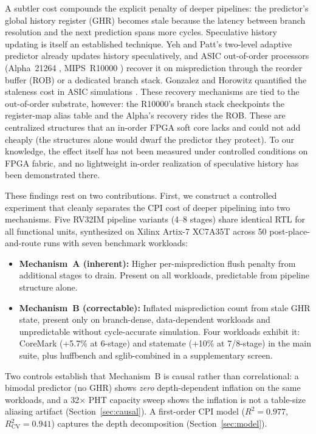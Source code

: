 \documentclass[acmsmall,nonacm,screen]{acmart}
\begin{document}
A subtler cost compounds the explicit penalty of deeper pipelines: the predictor's global history register (GHR) becomes stale because the latency between branch resolution and the next prediction spans more cycles.
Speculative history updating is itself an established technique. Yeh and Patt's two-level adaptive predictor \cite{yeh1991two} already updates history speculatively, and ASIC out-of-order processors (Alpha~21264 \cite{kessler1999alpha}, MIPS~R10000 \cite{yeager1996mips}) recover it on misprediction through the reorder buffer (ROB) or a dedicated branch stack. Gonzalez and Horowitz quantified the staleness cost in ASIC simulations \cite{gonzalez1999power}.
These recovery mechanisms are tied to the out-of-order substrate, however: the R10000's branch stack checkpoints the register-map alias table and the Alpha's recovery rides the ROB. These are centralized structures that an in-order FPGA soft core lacks and could not add cheaply (the structures alone would dwarf the predictor they protect).
To our knowledge, the effect itself has not been measured under controlled conditions on FPGA fabric, and no lightweight in-order realization of speculative history has been demonstrated there.

These findings rest on two contributions.
First, we construct a controlled experiment that cleanly separates the CPI cost of deeper pipelining into two mechanisms. Five RV32IM pipeline variants (4--8 stages) share identical RTL for all functional units, synthesized on Xilinx Artix-7 XC7A35T across 50 post-place-and-route runs with seven benchmark workloads:

\begin{itemize}
\item \textbf{Mechanism~A (inherent):} Higher per-misprediction flush penalty from additional stages to drain. Present on all workloads, predictable from pipeline structure alone.
\item \textbf{Mechanism~B (correctable):} Inflated misprediction count from stale GHR state, present only on branch-dense, data-dependent workloads and unpredictable without cycle-accurate simulation. Four workloads exhibit it: CoreMark (+5.7\% at 6-stage) and statemate (+10\% at 7/8-stage) in the main suite, plus huffbench and sglib-combined in a supplementary screen.
\end{itemize}

Two controls establish that Mechanism~B is causal rather than correlational: a bimodal predictor (no GHR) shows \emph{zero} depth-dependent inflation on the same workloads, and a 32$\times$ PHT capacity sweep shows the inflation is not a table-size aliasing artifact (Section~\ref{sec:causal}). A first-order CPI model ($R^2 = 0.977$, $R^2_{\text{CV}} = 0.941$) captures the depth decomposition (Section~\ref{sec:model}).
\end{document}
